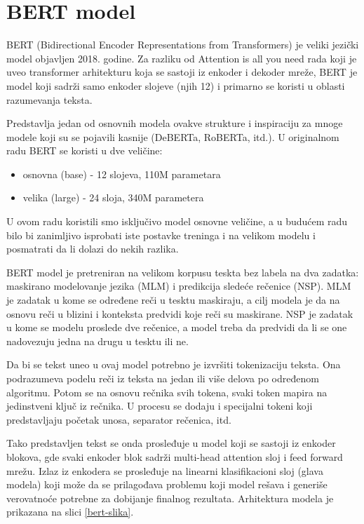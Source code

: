 \documentclass{article}
\theoremstyle{definition}
\begin{document}
	\section{BERT model} \label{bert}
	BERT (Bidirectional Encoder Representations from Transformers) \cite{bert}
	je veliki jezički model objavljen 2018. godine. 
	Za razliku od Attention is all you need rada \cite{attention} koji je uveo
	transformer arhitekturu koja se sastoji iz enkoder i dekoder mreže,
	BERT je model koji sadrži samo enkoder slojeve (njih 12) i primarno se 
	koristi u oblasti razumevanja teksta.

	Predstavlja jedan od osnovnih modela ovakve strukture i inspiraciju za 
	mnoge modele koji su se pojavili kasnije (DeBERTa, RoBERTa, itd.). 
	U originalnom radu BERT se koristi u dve veličine:
	\begin{itemize}
		\item osnovna (base) - 12 slojeva, 110M parametara
		\item velika (large) - 24 sloja, 340M parametera
	\end{itemize} 
	U ovom radu koristili smo isključivo model osnovne veličine, a u budućem radu
	bilo bi zanimljivo isprobati iste postavke treninga i na velikom modelu i 
	posmatrati da li dolazi do nekih razlika.

	BERT model je pretreniran na velikom korpusu teskta bez labela na dva 
	zadatka: maskirano modelovanje jezika (MLM) i predikcija sledeće rečenice 
	(NSP). MLM je zadatak u kome se određene reči u tesktu maskiraju, a cilj 
	modela je da na osnovu reči u blizini i konteksta predvidi koje reči su 
	maskirane. NSP je zadatak u kome se modelu proslede dve rečenice, a model 
	treba da predvidi da li se one nadovezuju jedna na drugu u tesktu ili ne.

	Da bi se tekst uneo u ovaj model potrebno je izvršiti tokenizaciju teksta. 
	Ona podrazumeva podelu reči iz teksta na jedan ili više delova po određenom 
	algoritmu. Potom se na osnovu rečnika svih tokena, svaki token mapira na
	jedinstveni ključ iz rečnika. U procesu se dodaju i specijalni tokeni koji 
	predstavljaju početak unosa, separator rečenica, itd.

	Tako predstavljen tekst se onda prosleđuje u model koji se sastoji iz enkoder
	blokova, gde svaki enkoder blok sadrži multi-head attention sloj i feed 
	forward mrežu. Izlaz iz enkodera se prosleđuje na linearni klasifikacioni 
	sloj (glava modela) koji može da se prilagođava problemu koji model rešava 
	i generiše verovatnoće potrebne za dobijanje finalnog rezultata. Arhitektura
	modela je prikazana na slici \ref{bert-slika}.
\end{document}
